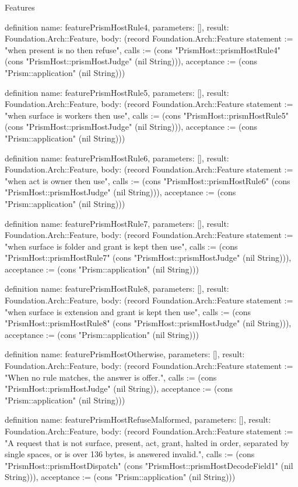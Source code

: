 \begin{lexlean}{Features}
\begin{semanticmodule}
definition{
  name: featurePrismHostRule4,
  parameters: [],
  result: Foundation.Arch::Feature,
  body: (record Foundation.Arch::Feature {statement := "when present is no then refuse", calls := (cons "PrismHost::prismHostRule4" (cons "PrismHost::prismHostJudge" (nil String))), acceptance := (cons "Prism::application" (nil String))})
}

definition{
  name: featurePrismHostRule5,
  parameters: [],
  result: Foundation.Arch::Feature,
  body: (record Foundation.Arch::Feature {statement := "when surface is workers then use", calls := (cons "PrismHost::prismHostRule5" (cons "PrismHost::prismHostJudge" (nil String))), acceptance := (cons "Prism::application" (nil String))})
}

definition{
  name: featurePrismHostRule6,
  parameters: [],
  result: Foundation.Arch::Feature,
  body: (record Foundation.Arch::Feature {statement := "when act is owner then use", calls := (cons "PrismHost::prismHostRule6" (cons "PrismHost::prismHostJudge" (nil String))), acceptance := (cons "Prism::application" (nil String))})
}

definition{
  name: featurePrismHostRule7,
  parameters: [],
  result: Foundation.Arch::Feature,
  body: (record Foundation.Arch::Feature {statement := "when surface is folder and grant is kept then use", calls := (cons "PrismHost::prismHostRule7" (cons "PrismHost::prismHostJudge" (nil String))), acceptance := (cons "Prism::application" (nil String))})
}

definition{
  name: featurePrismHostRule8,
  parameters: [],
  result: Foundation.Arch::Feature,
  body: (record Foundation.Arch::Feature {statement := "when surface is extension and grant is kept then use", calls := (cons "PrismHost::prismHostRule8" (cons "PrismHost::prismHostJudge" (nil String))), acceptance := (cons "Prism::application" (nil String))})
}

definition{
  name: featurePrismHostOtherwise,
  parameters: [],
  result: Foundation.Arch::Feature,
  body: (record Foundation.Arch::Feature {statement := "When no rule matches, the answer is offer.", calls := (cons "PrismHost::prismHostJudge" (nil String)), acceptance := (cons "Prism::application" (nil String))})
}

definition{
  name: featurePrismHostRefuseMalformed,
  parameters: [],
  result: Foundation.Arch::Feature,
  body: (record Foundation.Arch::Feature {statement := "A request that is not surface, present, act, grant, halted in order, separated by single spaces, or is over 136 bytes, is answered invalid.", calls := (cons "PrismHost::prismHostDispatch" (cons "PrismHost::prismHostDecodeField1" (nil String))), acceptance := (cons "Prism::application" (nil String))})
}


\end{semanticmodule}
\end{lexlean}
